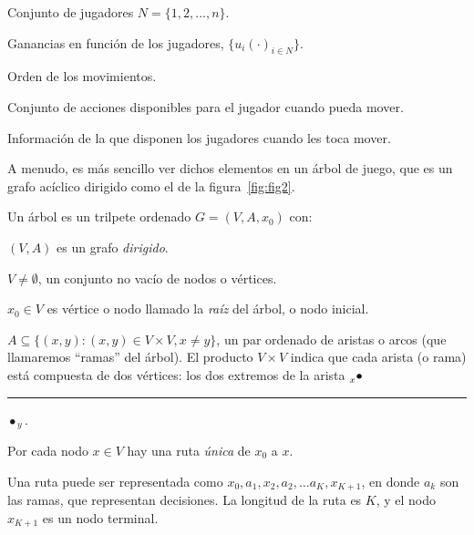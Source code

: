 \documentclass[12pt]{scrartcl}
\newcommand{\linebullet}[2]{$\prescript{}{#1}{\bullet}${\rule[3.5pt]{15pt}{1pt}}$\bullet_{\hspace{2pt}#2}$}
\begin{document}
\begin{myenum}
	\item Conjunto de jugadores $N = \{1, 2, ..., n \}$.
	\item Ganancias en función de los jugadores, \(\{u_i(\cdot)_{i \in N}\}\).
	\item Orden de los movimientos.
	\item Conjunto de acciones disponibles para el jugador cuando pueda mover.
	\item Información de la que disponen los jugadores cuando les toca mover.
\end{myenum}

A menudo, es más sencillo ver dichos elementos en un árbol de juego, que es un grafo acíclico dirigido como el de la figura~\ref{fig:fig2}.

Un árbol es un trilpete ordenado $G=(V, A, x_0)$ con:

\begin{myitemize}
	\item $ (V, A) $ es un grafo \textit{dirigido}.
	\item $V\neq\emptyset$, un conjunto no vacío de nodos o vértices.
	\item $ x_0 \in V $ es vértice o nodo llamado la \textit{raíz} del árbol, o nodo inicial. 
	\item $A\subseteq \{ (x,y)\colon (x,y) \in V \times V, x\neq y\}$, un par ordenado de aristas o arcos (que llamaremos ``ramas'' del árbol). El producto $V\times V$ indica que cada arista (o rama) está compuesta de dos vértices: los dos extremos de la arista \linebullet{x}{y}.
	\item Por cada nodo $ x \in V $ hay una ruta \textit{única} de $ x_0 $ a $ x $.
	\item Una ruta puede ser representada como $ x_0, a_1, x_2, a_2, \dots a_K, x_{K+1}$, en donde $ a_k $ son las ramas, que representan decisiones. La longitud de la ruta es $ K $, y el nodo $ x_{K+1} $ es un nodo terminal.  
\end{myitemize}
\end{document}
